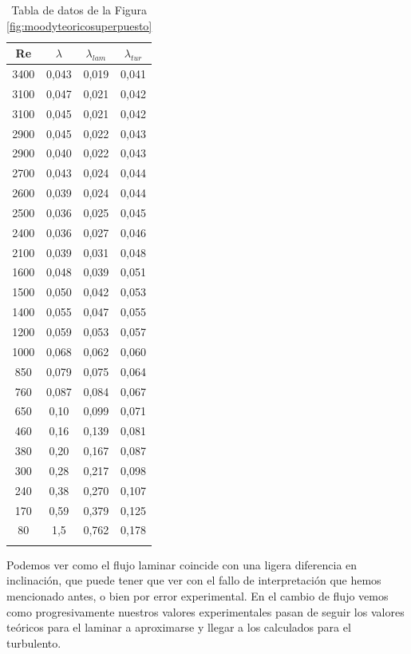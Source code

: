 \documentclass[a4paper,12pt,spanish]{article}
\begin{document}
	\begin{longtable}[c]{|c|c|c|c|}
		
		
		\hline
		Re & $\lambda$ & $\lambda_{lam}$ & $\lambda_{tur}$ \\ \hline
		\endfirsthead
		\endhead
		3400 & 0,043 & 0,019 & 0,041 \\ \hline
		3100 & 0,047 & 0,021 & 0,042 \\ \hline
		3100 & 0,045 & 0,021 & 0,042 \\ \hline
		2900 & 0,045 & 0,022 & 0,043 \\ \hline
		2900 & 0,040 & 0,022 & 0,043 \\ \hline
		2700 & 0,043 & 0,024 & 0,044 \\ \hline
		2600 & 0,039 & 0,024 & 0,044 \\ \hline
		2500 & 0,036 & 0,025 & 0,045 \\ \hline
		2400 & 0,036 & 0,027 & 0,046 \\ \hline
		2100 & 0,039 & 0,031 & 0,048 \\ \hline
		1600 & 0,048 & 0,039 & 0,051 \\ \hline
		1500 & 0,050 & 0,042 & 0,053 \\ \hline
		1400 & 0,055 & 0,047 & 0,055 \\ \hline
		1200 & 0,059 & 0,053 & 0,057 \\ \hline
		1000 & 0,068 & 0,062 & 0,060 \\ \hline
		850 & 0,079 & 0,075 & 0,064 \\ \hline
		760 & 0,087 & 0,084 & 0,067 \\ \hline
		650 & 0,10 & 0,099 & 0,071 \\ \hline
		460 & 0,16 & 0,139 & 0,081 \\ \hline
		380 & 0,20 & 0,167 & 0,087 \\ \hline
		300 & 0,28 & 0,217 & 0,098 \\ \hline
		240 & 0,38 & 0,270 & 0,107 \\ \hline
		170 & 0,59 & 0,379 & 0,125 \\ \hline
		80 & 1,5 & 0,762 & 0,178 \\ \hline
		
		\caption{Tabla de datos de la Figura \ref{fig:moodyteoricosuperpuesto}}
	\end{longtable}
	
	
	
	
	Podemos ver como el flujo laminar coincide con una ligera diferencia en inclinación, que puede tener que ver con el fallo de interpretación que hemos mencionado antes, o bien por error experimental. En el cambio de flujo vemos como progresivamente nuestros valores experimentales pasan de seguir los valores teóricos para el laminar a aproximarse y llegar a los calculados para el turbulento.
	 
\end{document}
